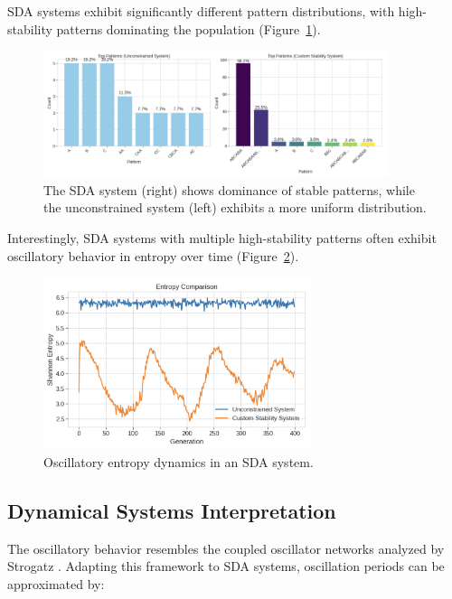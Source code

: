 \documentclass[preprint,12pt]{elsarticle}
\begin{document}
SDA systems exhibit significantly different pattern distributions, with high-stability patterns dominating the population (Figure~\ref{fig:figure_4}).

\begin{figure}[h]
    \centering
    \includegraphics[width=0.9\textwidth]{figure_4}
    \caption{The SDA system (right) shows dominance of stable patterns, while the unconstrained system (left) exhibits a more uniform distribution.}
    \label{fig:figure_4}
\end{figure}

Interestingly, SDA systems with multiple high-stability patterns often exhibit oscillatory behavior in entropy over time (Figure~\ref{fig:figure_5}).

\begin{figure}[h]
    \centering
    \includegraphics[width=0.7\textwidth]{figure_5}
    \caption{Oscillatory entropy dynamics in an SDA system.}
    \label{fig:figure_5}
\end{figure}

\subsection{Dynamical Systems Interpretation}

The oscillatory behavior resembles the coupled oscillator networks analyzed by Strogatz \cite{strogatz2001exploring}. Adapting this framework to SDA systems, oscillation periods can be approximated by:
\end{document}
